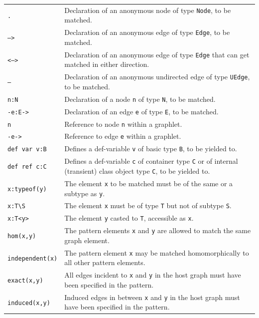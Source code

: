 \begin{table}[htbp]
\begin{minipage}{\linewidth} \renewcommand{\footnoterule}{} 
\begin{tabularx}{\linewidth}{|lX|}
\hline
\texttt{.}	& Declaration of an anonymous node of type \texttt{Node}, to be matched. \\
\texttt{-->}	& Declaration of an anonymous edge of type \texttt{Edge}, to be matched. \\
\texttt{<-->}	& Declaration of an anonymous edge of type \texttt{Edge} that can get matched in either direction. \\
\texttt{--}	& Declaration of an anonymous undirected edge of type \texttt{UEdge}, to be matched. \\
\texttt{n:N} & Declaration of a node \texttt{n} of type \texttt{N}, to be matched.\\
\texttt{-e:E->} & Declaration of an edge \texttt{e} of type \texttt{E}, to be matched.\\
\texttt{n} & Reference to node \texttt{n} within a graphlet.\\
\texttt{-e->} & Reference to edge \texttt{e} within a graphlet.\\
\texttt{def var v:B}	& Defines a def-variable \texttt{v} of basic type \texttt{B}, to be yielded to.\\
\texttt{def ref c:C}	& Defines a def-variable \texttt{c} of container type \texttt{C} or of internal (transient) class object type \texttt{C}, to be yielded to.\\
\hline
\texttt{x:typeof(y)} & The element \texttt{x} to be matched must be of the same or a subtype as \texttt{y}.\\
\texttt{x:T{\textbackslash}S} & The element \texttt{x} must be of type \texttt{T} but not of subtype \texttt{S}.\\
\texttt{x:T<y>} & The element \texttt{y} casted to \texttt{T}, accessible as \texttt{x}.\\
\hline
\texttt{hom(x,y)} & The pattern elements \texttt{x} and \texttt{y} are allowed to match the same graph element.\\
\texttt{independent(x)} & The pattern element \texttt{x} may be matched homomorphically to all other pattern elements.\\
\texttt{exact(x,y)} & All edges incident to \texttt{x} and \texttt{y} in the host graph must have been specified in the pattern.\\
\texttt{induced(x,y)} & Induced edges in between \texttt{x} and \texttt{y} in the host graph must have been specified in the pattern.\\

\end{tabularx}
\end{minipage}
\end{table}
